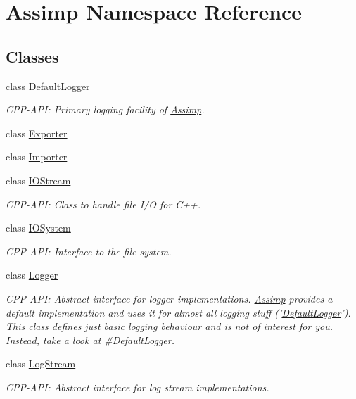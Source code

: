 \hypertarget{namespace_assimp}{\section{Assimp Namespace Reference}
\label{namespace_assimp}
}
\subsection*{Classes}
\begin{DoxyCompactItemize}
\item 
class \hyperlink{class_assimp_1_1_default_logger}{Default\-Logger}
\begin{DoxyCompactList}\small\item\em C\-P\-P-\/\-A\-P\-I\-: Primary logging facility of \hyperlink{namespace_assimp}{Assimp}. \end{DoxyCompactList}\item 
class \hyperlink{class_assimp_1_1_exporter}{Exporter}
\item 
class \hyperlink{class_assimp_1_1_importer}{Importer}
\item 
class \hyperlink{class_assimp_1_1_i_o_stream}{I\-O\-Stream}
\begin{DoxyCompactList}\small\item\em C\-P\-P-\/\-A\-P\-I\-: Class to handle file I/\-O for C++. \end{DoxyCompactList}\item 
class \hyperlink{class_assimp_1_1_i_o_system}{I\-O\-System}
\begin{DoxyCompactList}\small\item\em C\-P\-P-\/\-A\-P\-I\-: Interface to the file system. \end{DoxyCompactList}\item 
class \hyperlink{class_assimp_1_1_logger}{Logger}
\begin{DoxyCompactList}\small\item\em C\-P\-P-\/\-A\-P\-I\-: Abstract interface for logger implementations. \hyperlink{namespace_assimp}{Assimp} provides a default implementation and uses it for almost all logging stuff ('\hyperlink{class_assimp_1_1_default_logger}{Default\-Logger}'). This class defines just basic logging behaviour and is not of interest for you. Instead, take a look at \#\-Default\-Logger. \end{DoxyCompactList}\item 
class \hyperlink{class_assimp_1_1_log_stream}{Log\-Stream}
\begin{DoxyCompactList}\small\item\em C\-P\-P-\/\-A\-P\-I\-: Abstract interface for log stream implementations. \end{DoxyCompactList}\item 

\end{DoxyCompactItemize}
